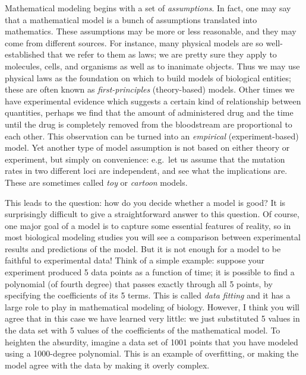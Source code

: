 \documentclass[
]{book}
\begin{document}
Mathematical modeling begins with a set of  \emph{assumptions}. In fact, one may say that a mathematical model is a bunch of assumptions translated into mathematics. These assumptions may be more or less reasonable, and they may come from different sources. For instance, many physical models are so well-established that we refer to them as laws; we are pretty sure they apply to molecules, cells, and organisms as well as to inanimate objects. Thus we may use physical laws as the foundation on which to build models of biological entities; these are often known as  \emph{first-principles} (theory-based) models. Other times we have experimental evidence which suggests a certain kind of relationship between quantities, perhaps we find that the amount of administered drug and the time until the drug is completely removed from the bloodstream are proportional to each other. This observation can be turned into an  \emph{empirical} (experiment-based) model. Yet another type of model assumption is not based on either theory or experiment, but simply on convenience: e.g.~let us assume that the mutation rates in two different loci are independent, and see what the implications are. These are sometimes called \emph{toy} or  \emph{cartoon} models. \citep{jungck_mathematical_2010}

This leads to the question: how do you decide whether a model is good? It is surprisingly difficult to give a straightforward answer to this question. Of course, one major goal of a model is to capture some essential features of reality, so in most biological modeling studies you will see a comparison between experimental results and predictions of the model. But it is not enough for a model to be faithful to experimental data! Think of a simple example: suppose your experiment produced 5 data points as a function of time; it is possible to find a polynomial (of fourth degree) that passes exactly through all 5 points, by specifying the coefficients of its 5 terms. This is called  \emph{data fitting} and it has a large role to play in mathematical modeling of biology. However, I think you will agree that in this case we have learned very little: we just substituted 5 values in the data set with 5 values of the coefficients of the mathematical model. To heighten the absurdity, imagine a data set of 1001 points that you have modeled using a 1000-degree polynomial. This is an example of overfitting, or making the model agree with the data by making it overly complex.
\end{document}
